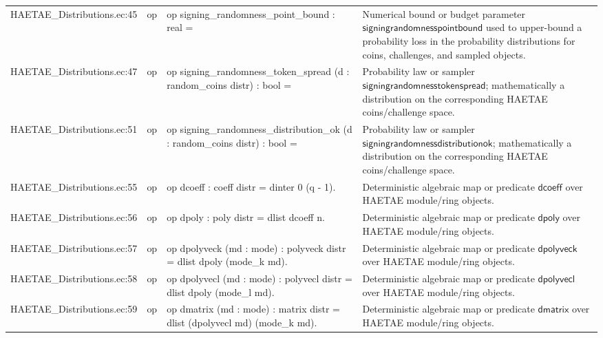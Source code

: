 \documentclass[10pt]{article}
\begin{document}
\begin{longtable}{L{0.11\textwidth}L{0.055\textwidth}L{0.385\textwidth}L{0.41\textwidth}}
HAETAE\_\allowbreak{}Distributions.\allowbreak{}ec:\allowbreak{}45 & op & {\ttfamily\scriptsize op signing\_\allowbreak{}randomness\_\allowbreak{}point\_\allowbreak{}bound : real =} & Numerical bound or budget parameter $\mathsf{signingrandomnesspointbound}$ used to upper-bound a probability loss in the probability distributions for coins, challenges, and sampled objects. \\
HAETAE\_\allowbreak{}Distributions.\allowbreak{}ec:\allowbreak{}47 & op & {\ttfamily\scriptsize op signing\_\allowbreak{}randomness\_\allowbreak{}token\_\allowbreak{}spread (d : random\_\allowbreak{}coins distr) : bool =} & Probability law or sampler $\mathsf{signingrandomnesstokenspread}$; mathematically a distribution on the corresponding HAETAE coins/challenge space. \\
HAETAE\_\allowbreak{}Distributions.\allowbreak{}ec:\allowbreak{}51 & op & {\ttfamily\scriptsize op signing\_\allowbreak{}randomness\_\allowbreak{}distribution\_\allowbreak{}ok (d : random\_\allowbreak{}coins distr) : bool =} & Probability law or sampler $\mathsf{signingrandomnessdistributionok}$; mathematically a distribution on the corresponding HAETAE coins/challenge space. \\
HAETAE\_\allowbreak{}Distributions.\allowbreak{}ec:\allowbreak{}55 & op & {\ttfamily\scriptsize op dcoeff : coeff distr = dinter 0 (q - 1).} & Deterministic algebraic map or predicate $\mathsf{dcoeff}$ over HAETAE module/ring objects. \\
HAETAE\_\allowbreak{}Distributions.\allowbreak{}ec:\allowbreak{}56 & op & {\ttfamily\scriptsize op dpoly : poly distr = dlist dcoeff n.} & Deterministic algebraic map or predicate $\mathsf{dpoly}$ over HAETAE module/ring objects. \\
HAETAE\_\allowbreak{}Distributions.\allowbreak{}ec:\allowbreak{}57 & op & {\ttfamily\scriptsize op dpolyveck (md : mode) : polyveck distr = dlist dpoly (mode\_\allowbreak{}k md).} & Deterministic algebraic map or predicate $\mathsf{dpolyveck}$ over HAETAE module/ring objects. \\
HAETAE\_\allowbreak{}Distributions.\allowbreak{}ec:\allowbreak{}58 & op & {\ttfamily\scriptsize op dpolyvecl (md : mode) : polyvecl distr = dlist dpoly (mode\_\allowbreak{}l md).} & Deterministic algebraic map or predicate $\mathsf{dpolyvecl}$ over HAETAE module/ring objects. \\
HAETAE\_\allowbreak{}Distributions.\allowbreak{}ec:\allowbreak{}59 & op & {\ttfamily\scriptsize op dmatrix (md : mode) : matrix distr = dlist (dpolyvecl md) (mode\_\allowbreak{}k md).} & Deterministic algebraic map or predicate $\mathsf{dmatrix}$ over HAETAE module/ring objects. \\

\end{longtable}
\end{document}
